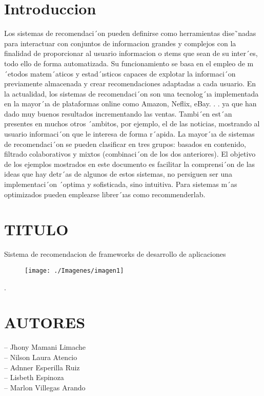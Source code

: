 {{\section{Introduccion}
\item{Los sistemas de recomendaci´on pueden definirse como herramientas dise˜nadas para interactuar con conjuntos de informacion grandes y complejos con la finalidad de proporcionar al usuario informacion o ıtems que sean de su inter´es, todo ello de forma automatizada. Su funcionamiento se basa en el empleo de m´etodos matem´aticos y estad´ısticos capaces de explotar la informaci´on previamente almacenada y crear recomendaciones adaptadas a cada usuario. En la actualidad, los sistemas de recomendaci´on son una tecnolog´ıa implementada en la mayor´ıa de plataformas online como Amazon, Neflix, eBay. . . ya que han dado muy buenos resultados incrementando las ventas. Tambi´en est´an presentes en muchos otros ´ambitos, por ejemplo, el de las noticias, mostrando al usuario informaci´on que le interesa de forma r´apida. La mayor´ıa de sistemas de recomendaci´on se pueden clasificar en tres grupos: basados en contenido, filtrado colaborativos y mixtos (combinaci´on de los dos anteriores). El objetivo de los ejemplos mostrados en este documento es facilitar la comprensi´on de las ideas que hay detr´as de algunos de estos sistemas, no persiguen ser una implementaci´on ´optima y sofisticada, sino intuitiva. Para sistemas m´as optimizados pueden emplearse librer´ıas como recommenderlab.}

\section{   TITULO}
\item{  Sistema de recomendacion de frameworks de desarrollo de aplicaciones}
\begin{figure}[htb]
\begin{center}
\texttt{[image: ./Imagenes/imagen1]}
\end{center}
\end{figure}

\item{.
}
\section{AUTORES}

\item{-- Jhony Mamani Limache\\ -- Nilson Laura Atencio\\ -- Adnner Esperilla Ruiz\\ -- Lisbeth Espinoza \\ -- Marlon Villegas Arando
}
\newpage
}}
